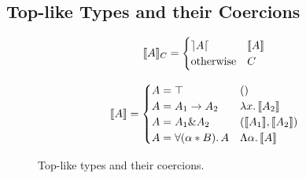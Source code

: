 \subsection{Top-like Types and their Coercions}\label{subsec:top-types}
\begin{figure}[!t]
\begin{spacing}{1}
\begin{minipage}[t]{.5\textwidth}
\vspace{-7pt}
  \begin{center} 
  \[
  \llbracket A \rrbracket_{C} = 
  \begin{cases} 
        \rceil A \lceil & \llbracket A \rrbracket \\ 
        \text{otherwise} & {C} 
  \end{cases}
  \]
  \end{center}
\end{minipage}
\begin{minipage}[t]{.5\textwidth}
\vspace{-7pt}
  \[
  \llbracket A \rrbracket = 
  \begin{cases} 
        A = \top & () \\
        A = A_1 \to A_2 & \lambda x.\, \llbracket A_2 \rrbracket \\
        A = A_1 \& A_2 & (\llbracket A_1 \rrbracket, \llbracket A_2 \rrbracket) \\
        A = \forall (\alpha * B).\, A & \Lambda \alpha.\, \llbracket A \rrbracket
  \end{cases}
  \]
\end{minipage}
\end{spacing}
  \caption{Top-like types and their coercions.}
  \label{fig:andcoercion}
\end{figure}

